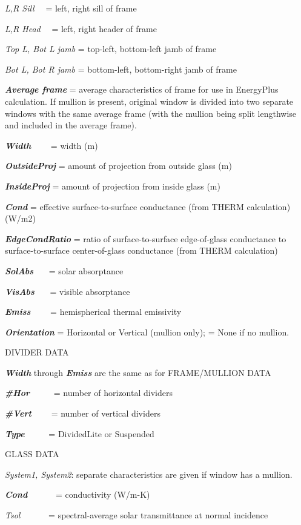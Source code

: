 \emph{L,R Sill}~~ = left, right sill of frame

\emph{L,R Head}~~ = left, right header of frame

\emph{Top L, Bot L jamb} = top-left, bottom-left jamb of frame

\emph{Bot L, Bot R jamb} = bottom-left, bottom-right jamb of frame

\textbf{\emph{Average frame}} = average characteristics of frame for use in EnergyPlus calculation. If mullion is present, original window is divided into two separate windows with the same average frame (with the mullion being split lengthwise and included in the average frame).

\textbf{\emph{Width}}~~~~ = width (m)

\textbf{\emph{OutsideProj}} = amount of projection from outside glass (m)

\textbf{\emph{InsideProj}} = amount of projection from inside glass (m)

\textbf{\emph{Cond}} = effective surface-to-surface conductance (from THERM calculation) (W/m2)

\textbf{\emph{EdgeCondRatio}} = ratio of surface-to-surface edge-of-glass conductance to surface-to-surface center-of-glass conductance (from THERM calculation)

\textbf{\emph{SolAbs}}~~~ = solar absorptance

\textbf{\emph{VisAbs}}~~~ = visible absorptance

\textbf{\emph{Emiss}}~~~~ = hemispherical thermal emissivity

\textbf{\emph{Orientation}} = Horizontal or Vertical (mullion only); = None if no mullion.

DIVIDER DATA

\textbf{\emph{Width}} through \textbf{\emph{Emiss}} are the same as for FRAME/MULLION DATA

\textbf{\emph{\#Hor}}~~~~~ = number of horizontal dividers

\textbf{\emph{\#Vert}}~~~~ = number of vertical dividers

\textbf{\emph{Type}}~~~~~ = DividedLite or Suspended

GLASS DATA

\emph{System1, System2}: separate characteristics are given if window has a mullion.

\textbf{\emph{Cond}}~~~~~~ = conductivity (W/m-K)

\emph{Tsol}~~~~~~ = spectral-average solar transmittance at normal incidence

